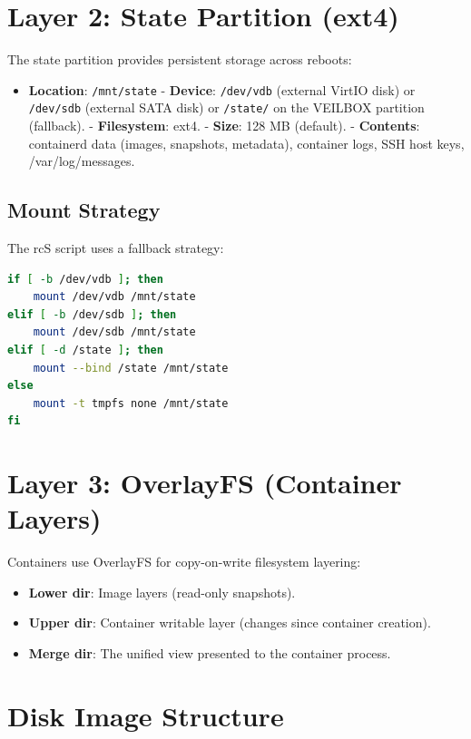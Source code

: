 \section{Layer 2: State Partition (ext4)}

The state partition provides persistent storage across reboots:

\begin{itemize}[nosep]
  \item \textbf{Location}: \texttt{/mnt/state}
  - \textbf{Device}: \texttt{/dev/vdb} (external VirtIO disk) or
        \texttt{/dev/sdb} (external SATA disk) or \texttt{/state/} on
        the VEILBOX partition (fallback).
  - \textbf{Filesystem}: ext4.
  - \textbf{Size}: 128 MB (default).
  - \textbf{Contents}: containerd data (images, snapshots, metadata),
        container logs, SSH host keys, /var/log/messages.
\end{itemize}

\subsection{Mount Strategy}

The rcS script uses a fallback strategy:

\begin{lstlisting}[language=bash]
if [ -b /dev/vdb ]; then
    mount /dev/vdb /mnt/state
elif [ -b /dev/sdb ]; then
    mount /dev/sdb /mnt/state
elif [ -d /state ]; then
    mount --bind /state /mnt/state
else
    mount -t tmpfs none /mnt/state
fi
\end{lstlisting}

\section{Layer 3: OverlayFS (Container Layers)}

Containers use OverlayFS for copy-on-write filesystem layering:

\begin{itemize}[nosep]
  \item \textbf{Lower dir}: Image layers (read-only snapshots).
  \item \textbf{Upper dir}: Container writable layer (changes since
        container creation).
  \item \textbf{Merge dir}: The unified view presented to the container
        process.
\end{itemize}

\section{Disk Image Structure}

